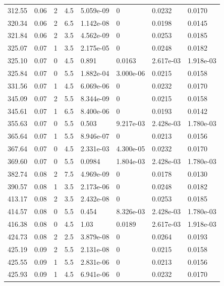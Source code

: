 \documentclass[preview]{standalone}
\begin{document}
{{{\begin{tabular}{L{1.2cm}C{1.2cm} C{0.3cm}C{0.5cm} C{1.4cm}C{1.4cm} C{1.4cm}C{1.4cm}}
  312.55  &  0.06  & 2     & 4.5 &  5.059e-09  & 0  & 0.0232 &  0.0170   \\ 
  320.34  &  0.06  & 2     & 6.5 &  1.142e-08  & 0  & 0.0198 &  0.0145   \\ 
  321.84  &  0.06  & 2     & 3.5 &  4.562e-09  & 0  & 0.0253 &  0.0185   \\ 
  325.07  &  0.07  & 1     & 3.5 &  2.175e-05  & 0  & 0.0248 &  0.0182   \\ 
  325.10  &  0.07  & 0     & 4.5 &  0.891  & 0.0163  & 2.617e-03 &  1.918e-03   \\ 
  325.84  &  0.07  & 0     & 5.5 &  1.882e-04  & 3.000e-06  & 0.0215 &  0.0158   \\ 
  331.56  &  0.07  & 1     & 4.5 &  6.069e-06  & 0  & 0.0232 &  0.0170   \\ 
  345.09  &  0.07  & 2     & 5.5 &  8.344e-09  & 0  & 0.0215 &  0.0158   \\ 
  345.61  &  0.07  & 1     & 6.5 &  8.400e-06  & 0  & 0.0193 &  0.0142   \\ 
  355.63  &  0.07  & 0     & 5.5 &  0.503  & 9.217e-03  & 2.428e-03 &  1.780e-03   \\ 
  365.64  &  0.07  & 1     & 5.5 &  8.946e-07  & 0  & 0.0213 &  0.0156   \\ 
  367.64  &  0.07  & 0     & 4.5 &  2.331e-03  & 4.300e-05  & 0.0232 &  0.0170   \\ 
  369.60  &  0.07  & 0     & 5.5 &  0.0984  & 1.804e-03  & 2.428e-03 &  1.780e-03   \\ 
  382.74  &  0.08  & 2     & 7.5 &  4.969e-09  & 0  & 0.0178 &  0.0130   \\ 
  390.57  &  0.08  & 1     & 3.5 &  2.173e-06  & 0  & 0.0248 &  0.0182   \\ 
  413.17  &  0.08  & 2     & 3.5 &  2.432e-08  & 0  & 0.0253 &  0.0185   \\ 
  414.57  &  0.08  & 0     & 5.5 &  0.454  & 8.326e-03  & 2.428e-03 &  1.780e-03   \\ 
  416.38  &  0.08  & 0     & 4.5 &  1.03  & 0.0189  & 2.617e-03 &  1.918e-03   \\ 
  424.73  &  0.08  & 2     & 2.5 &  3.879e-08  & 0  & 0.0264 &  0.0193   \\ 
  425.19  &  0.09  & 2     & 5.5 &  2.131e-08  & 0  & 0.0215 &  0.0158   \\ 
  425.55  &  0.09  & 1     & 5.5 &  2.831e-06  & 0  & 0.0213 &  0.0156   \\ 
  425.93  &  0.09  & 1     & 4.5 &  6.941e-06  & 0  & 0.0232 &  0.0170   \\ 

\end{tabular}}}}
\end{document}
